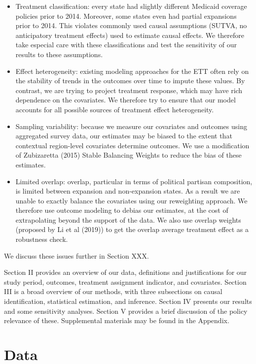 \documentclass[final]{article}
\begin{document}
\begin{itemize}
    \item Treatment classification: every state had slightly different Medicaid coverage policies prior to 2014. Moreover, some states even had partial expansions prior to 2014. This violates commonly used causal assumptions (SUTVA, no anticipatory treatment effects) used to estimate causal effects. We therefore take especial care with these classifications and test the sensitivity of our results to these assumptions.
    \item Effect heterogeneity: existing modeling approaches for the ETT often rely on the stability of trends in the outcomes over time to impute these values. By contrast, we are trying to project treatment response, which may have rich dependence on the covariates. We therefore try to ensure that our model accounts for all possible sources of treatment effect heterogeneity.
    \item Sampling variability: because we measure our covariates and outcomes using aggregated survey data, our estimates may be biased to the extent that contextual region-level covariates determine outcomes. We use a modification of Zubizaretta (2015) Stable Balancing Weights to reduce the bias of these estimates.
    \item Limited overlap: overlap, particular in terms of political partisan composition, is limited between expansion and non-expansion states. As a result we are unable to exactly balance the covariates using our reweighting approach. We therefore use outcome modeling to debias our estimates, at the cost of extrapolating beyond the support of the data. We also use overlap weights (proposed by Li et al (2019)) to get the overlap average treatment effect as a robustness check.
\end{itemize}

We discuss these issues further in Section XXX.

Section II provides an overview of our data, definitions and justifications for our study period, outcomes, treatment assignment indicator, and covariates. Section III is a broad overview of our methods, with three subsections on causal identification, statistical estimation, and inference. Section IV presents our results and some sensitivity analyses. Section V provides a brief discussion of the policy relevance of these. Supplemental materials may be found in the Appendix.

\section{Data}
\end{document}
